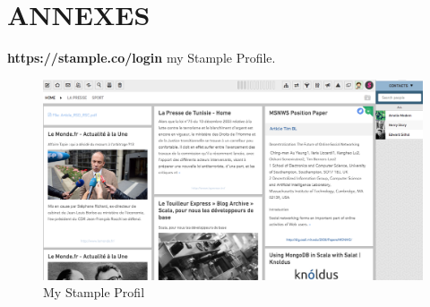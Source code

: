 \chapter{ANNEXES}

\textbf{https://stample.co/login} my Stample Profile.
\begin{figure}[H]
        \centering
                \centering
                \includegraphics[width=\textwidth]{Stample.png}
		\caption{My Stample Profil}
               
\end{figure}

